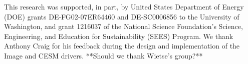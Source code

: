 \documentclass[gmd, manuscript]{copernicus}
\begin{document}


\begin{acknowledgements}
  This research was supported, in part, by United States Department of Energy (DOE) grants DE-FG02-07ER64460 and DE-SC0006856 to the University of Washington, and grant 1216037 of the National Science Foundation's Science, Engineering, and Education for Sustainability (SEES) Program. We thank Anthony Craig for his feedback during the design and implementation of the Image and CESM drivers. **Should we thank Wietse's group?**
\end{acknowledgements}




%
%
%





\end{document}
